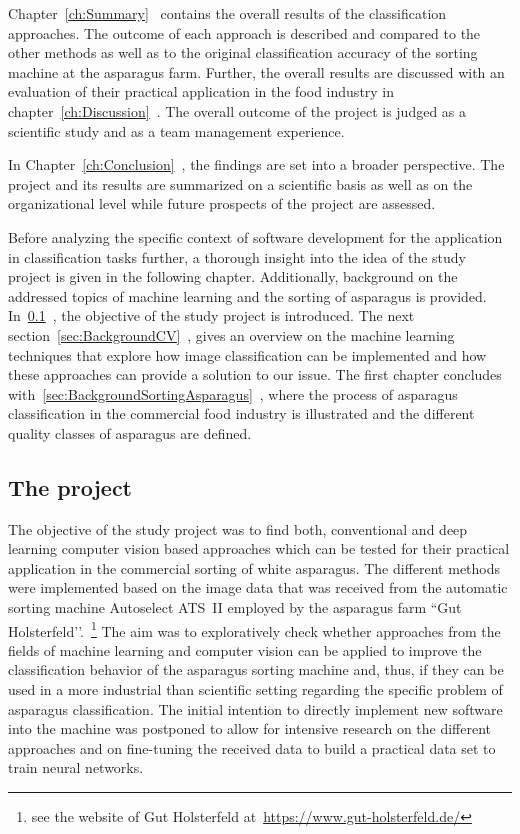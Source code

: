 Chapter~\ref{ch:Summary}~ contains the overall results of the classification approaches. The outcome of each approach is described and compared to the other methods as well as to the original classification accuracy of the sorting machine at the asparagus farm. Further, the overall results are discussed with an evaluation of their practical application in the food industry in chapter~\ref{ch:Discussion}~. The overall outcome of the project is judged as a scientific study and as a team management experience.

In Chapter~\ref{ch:Conclusion}~, the findings are set into a broader perspective. The project and its results are summarized on a scientific basis as well as on the organizational level while future prospects of the project are assessed.

\bigskip
Before analyzing the specific context of software development for the application in classification tasks further, a thorough insight into the idea of the study project is given in the following chapter. Additionally, background on the addressed topics of machine learning and the sorting of asparagus is provided.
In~\ref{sec:Project}~, the objective of the study project is introduced. The next section~\ref{sec:BackgroundCV}~, gives an overview on the machine learning techniques that explore how image classification can be implemented and how these approaches can provide a solution to our issue. The first chapter concludes with~\ref{sec:BackgroundSortingAsparagus}~, where the process of asparagus classification in the commercial food industry is illustrated and the different quality classes of asparagus are defined.


\subsection{The project}
\label{sec:Project}

The objective of the study project was to find both, conventional and deep learning computer vision based approaches which can be tested for their practical application in the commercial sorting of white asparagus. The different methods were implemented based on the image data that was received from the automatic sorting machine Autoselect ATS~II employed by the asparagus farm ``Gut Holsterfeld’’.~\footnote{see the website of Gut Holsterfeld at~\url{https://www.gut-holsterfeld.de/}} The aim was to exploratively check whether approaches from the fields of machine learning and computer vision can be applied to improve the classification behavior of the asparagus sorting machine and, thus, if they can be used in a more industrial than scientific setting regarding the specific problem of asparagus classification. The initial intention to directly implement new software into the machine was postponed to allow for intensive research on the different approaches and on fine-tuning the received data to build a practical data set to train neural networks.

